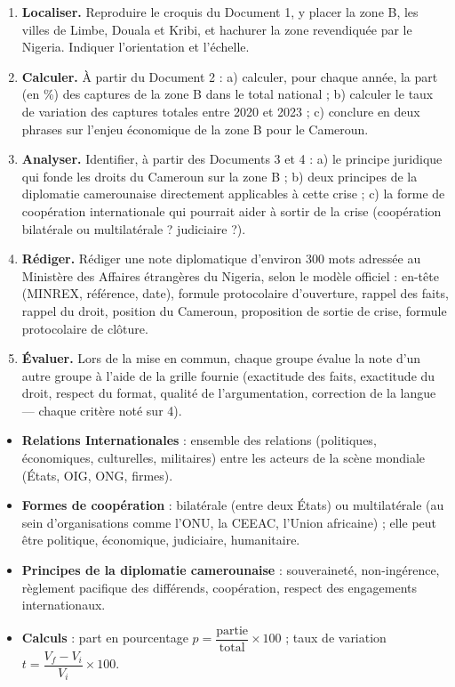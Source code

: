 \documentclass[11pt]{article}
\newcommand{\cle}[1]{{\popxbold\color{popdark}#1}}
\newcounter{popsec}
\newcounter{popsub}
\newcommand{\courssub}[1]{%
  \stepcounter{popsub}%
  \par\vspace{9pt}\noindent{\popxbold\fontsize{11.5}{13}\selectfont\color{popink}{\color{poporange}\thepopsec.\thepopsub}\hspace{6pt}#1}\par\nopagebreak\vspace{4pt}
}
\begin{document}
\begin{enumerate}
\item \textbf{Localiser.} Reproduire le croquis du Document 1, y placer la zone B, les villes de Limbe, Douala et Kribi, et hachurer la zone revendiquée par le Nigeria. Indiquer l'orientation et l'échelle.
\item \textbf{Calculer.} À partir du Document 2 : a) calculer, pour chaque année, la part (en \%) des captures de la zone B dans le total national ; b) calculer le taux de variation des captures totales entre 2020 et 2023 ; c) conclure en deux phrases sur l'enjeu économique de la zone B pour le Cameroun.
\item \textbf{Analyser.} Identifier, à partir des Documents 3 et 4 : a) le principe juridique qui fonde les droits du Cameroun sur la zone B ; b) deux principes de la diplomatie camerounaise directement applicables à cette crise ; c) la forme de coopération internationale qui pourrait aider à sortir de la crise (coopération bilatérale ou multilatérale ? judiciaire ?).
\item \textbf{Rédiger.} Rédiger une \cle{note diplomatique} d'environ 300 mots adressée au Ministère des Affaires étrangères du Nigeria, selon le modèle officiel : en-tête (MINREX, référence, date), formule protocolaire d'ouverture, rappel des faits, rappel du droit, position du Cameroun, proposition de sortie de crise, formule protocolaire de clôture.
\item \textbf{Évaluer.} Lors de la mise en commun, chaque groupe évalue la note d'un autre groupe à l'aide de la grille fournie (exactitude des faits, exactitude du droit, respect du format, qualité de l'argumentation, correction de la langue — chaque critère noté sur 4).
\end{enumerate}

\courssub{Ressources à mobiliser}

\begin{aretenir}
\begin{itemize}
\item \textbf{Relations Internationales} : ensemble des relations (politiques, économiques, culturelles, militaires) entre les acteurs de la scène mondiale (États, OIG, ONG, firmes).
\item \textbf{Formes de coopération} : bilatérale (entre deux États) ou multilatérale (au sein d'organisations comme l'ONU, la CEEAC, l'Union africaine) ; elle peut être politique, économique, judiciaire, humanitaire.
\item \textbf{Principes de la diplomatie camerounaise} : souveraineté, non-ingérence, règlement pacifique des différends, coopération, respect des engagements internationaux.
\item \textbf{Calculs} : part en pourcentage $p = \dfrac{\text{partie}}{\text{total}} \times 100$ ; taux de variation $t = \dfrac{V_f - V_i}{V_i} \times 100$.
\end{itemize}
\end{aretenir}
\end{document}

